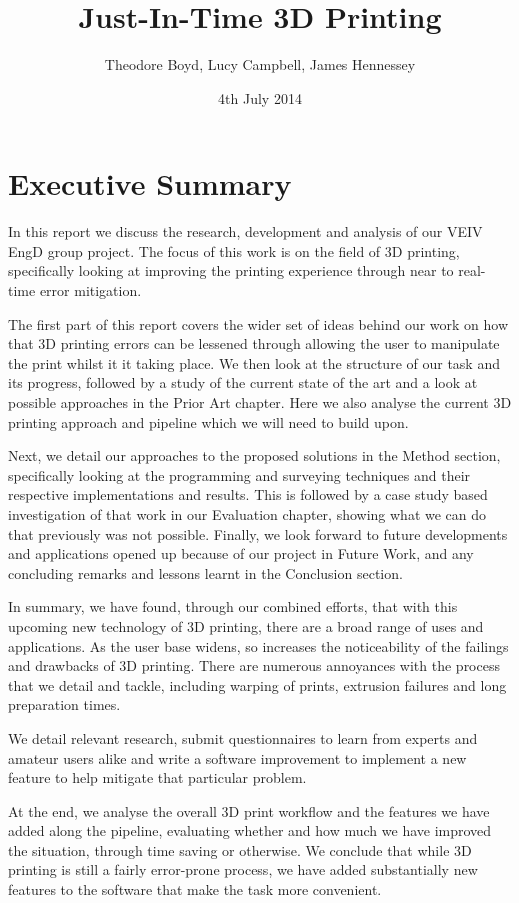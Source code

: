 \documentclass[pdftex, 11pt]{report} %
\title{Just-In-Time 3D Printing}
\author{Theodore Boyd, Lucy Campbell, James Hennessey}
\date{4th July 2014} %
\begin{document}
\maketitle

\chapter{Executive Summary}
In this report we discuss the research, development and analysis of our VEIV EngD group project. The focus of this work is on the field of 3D printing, specifically looking at improving the printing experience through near to real-time error mitigation.

The first part of this report covers the wider set of ideas behind our work on how that 3D printing errors can be lessened through allowing the user to manipulate the print whilst it it taking place. We then look at the structure of our task and its progress, followed by a study of the current state of the art and a look at possible approaches in the Prior Art chapter. Here we also analyse the current 3D printing approach and pipeline which we will need to build upon.

Next, we detail our approaches to the proposed solutions in the Method section, specifically looking at the programming and surveying techniques and their respective implementations and results. This is followed by a case study based investigation of that work in our Evaluation chapter, showing what we can do that previously was not possible.
Finally, we look forward to future developments and applications opened up because of our project in Future Work, and any concluding remarks and lessons learnt in the Conclusion section.

In summary, we have found, through our combined efforts, that with this upcoming new technology of 3D printing, there are a broad range of uses and applications. As the user base widens, so increases the noticeability of the failings and drawbacks of 3D printing. There are numerous annoyances with the process that we detail and tackle, including warping of prints, extrusion failures and long preparation times.

We detail relevant research, submit questionnaires to learn from experts and amateur users alike and write a software improvement to implement a new feature to help mitigate that particular problem.

At the end, we analyse the overall 3D print workflow and the features we have added along the pipeline, evaluating whether and how much we have improved the situation, through time saving or otherwise. We conclude that while 3D printing is still a fairly error-prone process, we have added substantially new features to the software that make the task more convenient.
\end{document}
